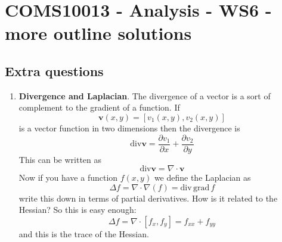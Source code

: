 \documentclass[11pt,a4paper]{scrartcl}
\begin{document}
\section*{COMS10013 - Analysis - WS6 - more outline solutions}
        
\subsection*{Extra questions}

\begin{enumerate}
\item \textbf{Divergence and Laplacian}. The divergence of a vector is
  a sort of complement to the gradient of a function. If
  \begin{equation}
    \mathbf{v}(x,y)=[v_1(x,y),v_2(x,y)]
  \end{equation}
  is a vector function in two dimensions then the divergence is
  \begin{equation}
    \textrm{div}\mathbf{v}=\frac{\partial v_1}{\partial x}+\frac{\partial v_2}{\partial y}
  \end{equation}
  This can be written as
  \begin{equation}
    \textrm{div}\mathbf{v}=\nabla\cdot\mathbf{v}
  \end{equation}
  Now if you have a function $f(x,y)$ we define the Laplacian as
  \begin{equation}
    \Delta f=\nabla\cdot\nabla(f)=\textrm{div}\,\textrm{grad}\,f
  \end{equation}
  write this down in terms of partial derivatives. How is it related to the Hessian? So this is easy enough:
  \begin{equation}
    \Delta f=\nabla\cdot [f_x,f_y]=f_{xx}+f_{yy}
  \end{equation}
  and this is the trace of the Hessian.

  
 

\end{enumerate}
\end{document}
